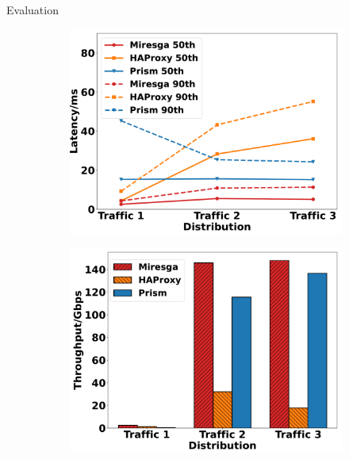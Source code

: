 \documentclass[final, 24pt]{beamer}
\newlength{\colwidth}
\begin{document}
\begin{frame}[t]
\begin{columns}[t]
\begin{column}{\colwidth}
\begin{block}{Evaluation}
\begin{figure}
        \label{fig:fixed}
        \centering
        \begin{subfigure}[h]{0.48\colwidth}
            \centering
            \includegraphics[width=\linewidth]{pic/mux_latency.pdf}
            \caption{}
            \label{fig:mux_lantency}
        \end{subfigure}
        \begin{subfigure}[h]{0.48\colwidth}
            \centering
            \includegraphics[width=\linewidth]{pic/mux_throughput.pdf}
            \caption{}
            \label{fig:mux_throughput}
        \end{subfigure}

\end{figure}
\end{block}
\end{column}
\end{columns}
\end{frame}
\end{document}
